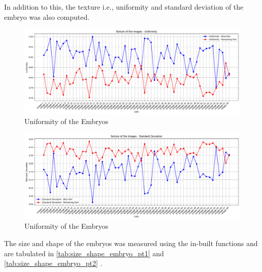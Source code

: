 \documentclass{article}
\begin{document}
In addition to this, the texture i.e., uniformity and standard deviation of the embryo was also computed. 
\begin{figure}[h!]
    \centering
    \includegraphics[width=1\linewidth]{Report/Images/Texture_Segments_Uniformity.png}
    \caption{Uniformity of the Embryos}
    \label{fig:embryo_uniformity}
\end{figure}
\begin{figure}[h!]
    \centering
    \includegraphics[width=1\linewidth]{Report/Images/Texture_Segments_StandardDeviation.png}
    \caption{Uniformity of the Embryos}
    \label{fig:embryo_uniformity}
\end{figure}
The size and shape of the embryos was measured using the in-built functions and are tabulated in \ref{tab:size_shape_embryo_pt1} and \ref{tab:size_shape_embryo_pt2} .
\end{document}
